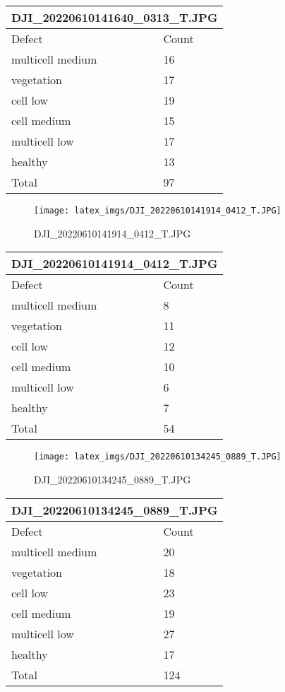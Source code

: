 \documentclass{article}%
\begin{document}
%
\begin{longtable}[c]{|l|l|}%
\hline%
\multicolumn{2}{|c|}{DJI\_20220610141640\_0313\_T.JPG}\\%
\hline%
Defect&Count\\%
\hline%
\endhead%
\hline%
multicell medium&16\\%
vegetation&17\\%
cell low&19\\%
cell medium&15\\%
multicell low&17\\%
healthy&13\\%
\hline%
Total&97\\%
\hline%
\end{longtable}%


\begin{figure}[h!]%
\centering%
\texttt{[image: latex\_imgs/DJI\_20220610141914\_0412\_T.JPG]}%
\caption{DJI\_20220610141914\_0412\_T.JPG}%
\end{figure}

%
\begin{longtable}[c]{|l|l|}%
\hline%
\multicolumn{2}{|c|}{DJI\_20220610141914\_0412\_T.JPG}\\%
\hline%
Defect&Count\\%
\hline%
\endhead%
\hline%
multicell medium&8\\%
vegetation&11\\%
cell low&12\\%
cell medium&10\\%
multicell low&6\\%
healthy&7\\%
\hline%
Total&54\\%
\hline%
\end{longtable}%
\newpage%


\begin{figure}[h!]%
\centering%
\texttt{[image: latex\_imgs/DJI\_20220610134245\_0889\_T.JPG]}%
\caption{DJI\_20220610134245\_0889\_T.JPG}%
\end{figure}

%
\begin{longtable}[c]{|l|l|}%
\hline%
\multicolumn{2}{|c|}{DJI\_20220610134245\_0889\_T.JPG}\\%
\hline%
Defect&Count\\%
\hline%
\endhead%
\hline%
multicell medium&20\\%
vegetation&18\\%
cell low&23\\%
cell medium&19\\%
multicell low&27\\%
healthy&17\\%
\hline%
Total&124\\%
\hline%
\end{longtable}%
\end{document}
